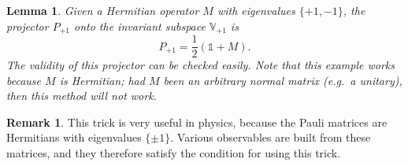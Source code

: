 \documentclass{article}
\theoremstyle{definition}
\newtheorem{rem}{Remark}[section]
\theoremstyle{plain}
\newtheorem{lem}{Lemma}[section]
\numberwithin{equation}{section}
\begin{document}
\begin{lem}
    Given a Hermitian operator $M$ with 
    eigenvalues $\{+1,-1\}$, 
    the projector $P_{+1}$ onto the 
    invariant subspace $\mathbb{V}_{+1}$ is 
    \begin{equation}
        P_{+1}=\frac{1}{2}(\mathds{1} + M). 
    \label{eqn:projector-onto-plus-one-subspace}
    \end{equation}
    The validity of this projector can be checked easily. 
    Note that this example works because $M$ is Hermitian; 
    had $M$ been an arbitrary normal matrix (\textit{e.g.}~a unitary), 
    then this method will not work.
\end{lem}

\begin{rem}
    This trick is very useful in physics, because 
    the Pauli matrices are Hermitians with 
    eigenvalues $\{ \pm 1\}$. Various observables are built 
    from these matrices, and they therefore satisfy the 
    condition for using this trick. 
\end{rem}

\printbibliography
\end{document}
